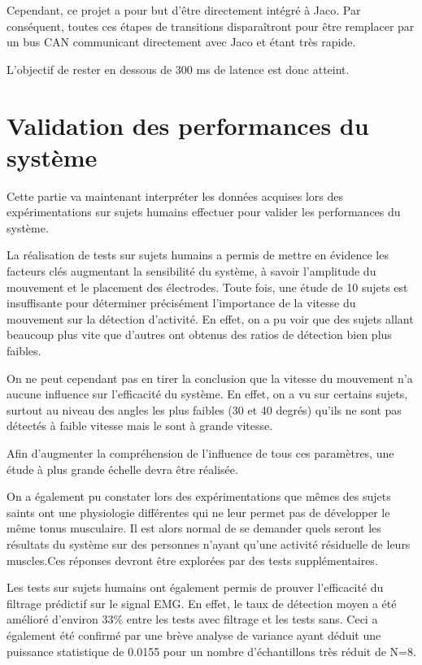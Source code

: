 \documentclass[letterpaper, twoside, 12pt, memoire, creativecommons, hyperref]{thETS}
\begin{document}
Cependant, ce projet a pour but d'être directement intégré à Jaco. Par conséquent, toutes ces étapes de transitions disparaîtront pour être remplacer par un bus CAN communicant directement avec Jaco et étant très rapide. 

L'objectif de rester en dessous de 300 ms de latence est donc atteint.

\section{Validation des performances du système}

Cette partie va maintenant interpréter les données acquises lors des expérimentations sur sujets humains effectuer pour valider les performances du système. 

La réalisation de tests sur sujets humains a permis de mettre en évidence les facteurs clés augmentant la sensibilité du système, à savoir l'amplitude du mouvement et le placement des électrodes. Toute fois, une étude de 10 sujets est insuffisante pour déterminer précisément l'importance de la vitesse du mouvement sur la détection d'activité. En effet, on a pu voir que des sujets allant beaucoup plus vite que d'autres ont obtenus des ratios de détection bien plus faibles.

On ne peut cependant pas en tirer la conclusion que la vitesse du mouvement n'a aucune influence sur l'efficacité du système. En effet, on a vu sur certains sujets, surtout au niveau des angles les plus faibles (30 et 40 degrés) qu'ils ne sont pas détectés à faible vitesse mais le sont à grande vitesse.

Afin d'augmenter la compréhension de l'influence de tous ces paramètres, une étude à plus grande échelle devra être réalisée.

On a également pu constater lors des expérimentations que mêmes des sujets saints ont une physiologie différentes qui ne leur permet pas de développer le même tonus musculaire. Il est alors normal de se demander quels seront les résultats du système sur des personnes n'ayant qu'une activité résiduelle de leurs muscles.Ces réponses devront être explorées par des tests supplémentaires.

Les tests sur sujets humains ont également permis de prouver l'efficacité du filtrage prédictif sur le signal EMG. En effet, le taux de détection moyen a été amélioré d'environ 33\% entre les tests avec filtrage et les tests sans. Ceci a également été confirmé par une brève analyse de variance ayant déduit une puissance statistique de 0.0155 pour un nombre d'échantillons très réduit de N=8.
\end{document}
